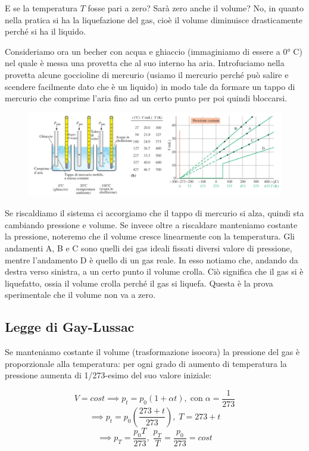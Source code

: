 E se la temperatura $T$ fosse pari a zero? Sarà zero anche il volume? No, in quanto nella pratica si ha la liquefazione del gas, cioè il volume diminuisce drasticamente perché si ha il liquido.

\vspace{0.2cm}Consideriamo ora un becher con acqua e ghiaccio (immaginiamo di essere a 0° C) nel quale è messa una provetta che al suo interno ha aria. Introfuciamo nella provetta alcune goccioline di mercurio (usiamo il mercurio perché può salire e scendere facilmente dato che è un liquido) in modo tale da formare un tappo di mercurio che comprime l'aria fino ad un certo punto per poi quindi bloccarsi.

\begin{figure}[htp]
    \centering
    \includegraphics[width=15cm]{immagini/esperimento_provetta.png}
\end{figure}

Se riscaldiamo il sistema ci accorgiamo che il tappo di mercurio si alza, quindi sta cambiando pressione e volume. Se invece oltre a riscaldare manteniamo costante la pressione, noteremo che il volume cresce linearmente con la temperatura. Gli andamenti A, B e C sono quelli dei gas ideali fissati diversi valore di pressione, mentre l'andamento D è quello di un gas reale. In esso notiamo che, andando da destra verso sinistra, a un certo punto il volume crolla. Ciò significa che il gas si è liquefatto, ossia il volume crolla perché il gas si liquefa. Questa è la prova sperimentale che il volume non va a zero.
\subsection{Legge di Gay-Lussac}
Se manteniamo costante il volume (trasformazione isocora) la pressione del gas è proporzionale alla temperatura: per ogni grado di aumento di temperatura la pressione aumenta di 1/273-esimo del suo valore iniziale:

$$V=cost \implies p_t=p_0(1 + \alpha t), \; \text{con} \; \alpha=\frac{1}{273}$$
$$\implies p_t=p_0 \left( \frac{273 + t}{273} \right), \; T=273 + t$$
$$\implies p_T = \frac{p_0 T}{273}, \; \frac{p_T}{T}=\frac{p_0}{273}=cost$$

